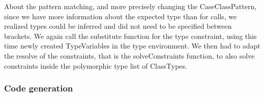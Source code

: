 About the pattern matching, and more precisely changing the CaseClassPattern, since we have more information about the expected type than for calls, we realized types could be inferred and did not need to be specified between brackets. We again call the substitute function for the type constraint, using this time newly created TypeVariables in the type environment. We then had to adapt the resolve of the constraints, that is the solveConstraints function, to also solve constraints inside the polymorphic type list of ClassTypes.
\subsubsection{Code generation}
